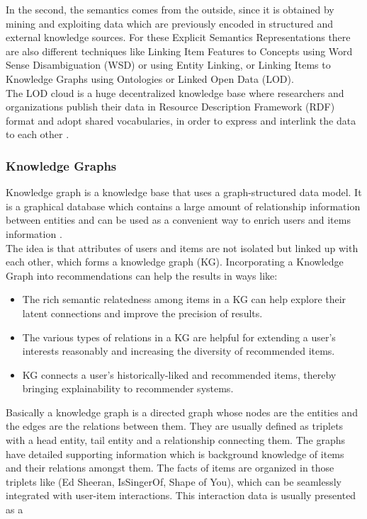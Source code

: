 \documentclass[\myFontSize,a4paper,oneside,hidelinks]{article}
\begin{document}
%
In the second, the semantics comes from the outside, since it is obtained by mining and exploiting data
which are previously encoded in structured and external knowledge sources. For these Explicit Semantics Representations there are also different techniques like Linking Item Features to Concepts using Word Sense Disambiguation (WSD) or using Entity Linking, or Linking Items to Knowledge Graphs using Ontologies or Linked Open Data (LOD). \cite{Musto2022251} \\
The LOD cloud is a huge decentralized knowledge base where researchers and organizations publish their data in Resource Description Framework (RDF) format and adopt shared vocabularies, in order to express and interlink the data to each other \cite{Musto2017405}.
%
%
%
\subsubsection{Knowledge Graphs}
Knowledge graph is a knowledge base that uses a graph-structured data model. It is a graphical database which contains a large amount of relationship information between entities and can be used as a convenient way to enrich users and items information \cite{Imene2022488}.\\
%
The idea is that attributes of users and items are not isolated but linked up with each other, which forms a knowledge graph (KG). Incorporating a Knowledge Graph into recommendations can help the results in ways like:
\begin{itemize}
\item The rich semantic relatedness among items in a KG can help explore their latent connections and improve the precision of results.
\item The various types of relations in a KG are helpful for extending a user’s interests reasonably and increasing the diversity of recommended items.
\item KG connects a user’s historically-liked and recommended items, thereby bringing explainability to recommender systems. \cite{Wang20193307}
\end{itemize}
%
Basically a knowledge graph is a directed graph whose nodes are the entities and the edges are the relations between them. They are usually defined as triplets with a head entity, tail entity and a relationship connecting them. The graphs have detailed supporting information which is background knowledge of items and their relations amongst them. The facts of items are organized in those triplets like (Ed Sheeran, IsSingerOf, Shape of You), which can be seamlessly integrated with user-item interactions. This interaction data is usually presented as a
\end{document}
